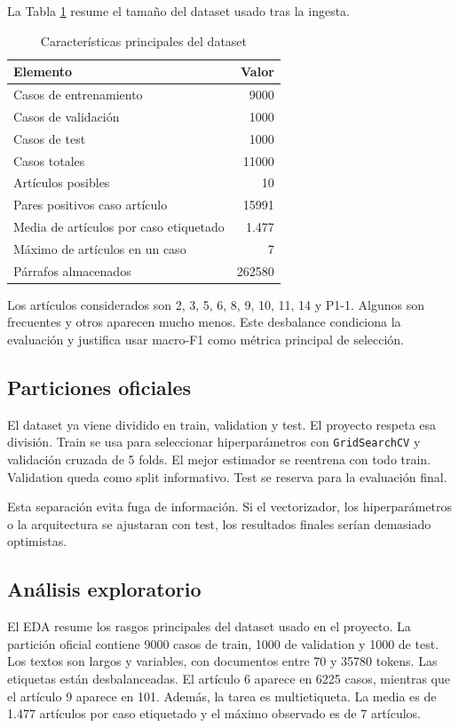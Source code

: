 \documentclass[11pt,a4paper]{article}
\begin{document}
La Tabla \ref{tab_dataset} resume el tamaño del dataset usado tras la ingesta.

\begin{table}[H]
\centering
\caption{Características principales del dataset}
\label{tab_dataset}
\small
\begin{tabular}{@{}lr@{}}
\toprule
\textbf{Elemento} & \textbf{Valor}\\
\midrule
Casos de entrenamiento & 9000\\
Casos de validación & 1000\\
Casos de test & 1000\\
Casos totales & 11000\\
Artículos posibles & 10\\
Pares positivos caso artículo & 15991\\
Media de artículos por caso etiquetado & 1.477\\
Máximo de artículos en un caso & 7\\
Párrafos almacenados & 262580\\
\bottomrule
\end{tabular}
\end{table}

Los artículos considerados son 2, 3, 5, 6, 8, 9, 10, 11, 14 y P1-1. Algunos son frecuentes y otros aparecen mucho menos. Este desbalance condiciona la evaluación y justifica usar macro-F1 como métrica principal de selección.

\subsection{Particiones oficiales}

El dataset ya viene dividido en train, validation y test. El proyecto respeta esa división. Train se usa para seleccionar hiperparámetros con \texttt{GridSearchCV} y validación cruzada de 5 folds. El mejor estimador se reentrena con todo train. Validation queda como split informativo. Test se reserva para la evaluación final.

Esta separación evita fuga de información. Si el vectorizador, los hiperparámetros o la arquitectura se ajustaran con test, los resultados finales serían demasiado optimistas.

\subsection{Análisis exploratorio}

El EDA resume los rasgos principales del dataset usado en el proyecto. La partición oficial contiene 9000 casos de train, 1000 de validation y 1000 de test. Los textos son largos y variables, con documentos entre 70 y 35780 tokens. Las etiquetas están desbalanceadas. El artículo 6 aparece en 6225 casos, mientras que el artículo 9 aparece en 101. Además, la tarea es multietiqueta. La media es de 1.477 artículos por caso etiquetado y el máximo observado es de 7 artículos.
\end{document}
